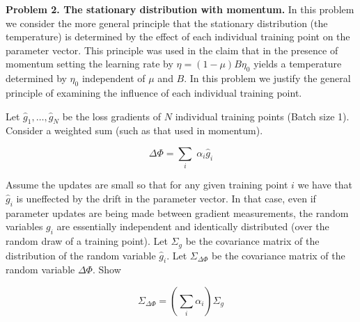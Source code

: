 \documentclass{article}
\begin{document}
\eject

{\bf Problem 2. The stationary distribution with momentum.}  In this problem we consider the more general principle that the
stationary distribution (the temperature) is determined by the effect of each individual training point on the parameter vector.  This principle was used in the
claim that in the presence of momentum setting the learning rate by $\eta = (1-\mu)B\eta_0$ yields a temperature determined by $\eta_0$ independent of
$\mu$ and $B$.
In this problem we justify the general principle of examining the influence of each individual training point.

\medskip
Let $\hat{g}_1, \ldots, \hat{g}_N$
be the loss gradients of $N$ individual training points (Batch size 1).  Consider a weighted sum (such as that used in momentum).

$$\Delta \Phi = \sum_i\; \alpha_i\hat{g}_i$$

Assume the updates are small so that for any given training point $i$ we have that $\hat{g}_i$ is uneffected by the drift in the parameter vector.
In that case, even if parameter updates are being made between gradient measurements, the random variables $g_i$ are essentially independent
and identically distributed (over the random draw of a training point).  Let $\Sigma_g$ be the covariance matrix of the distribution of the
random variable $\hat{g}_i$.  Let $\Sigma_{\Delta \Phi}$ be the covariance matrix of the random variable $\Delta \Phi$.
Show

$$\Sigma_{\Delta \Phi} = \left(\sum_i \alpha_i\right)\Sigma_g$$
\end{document}
